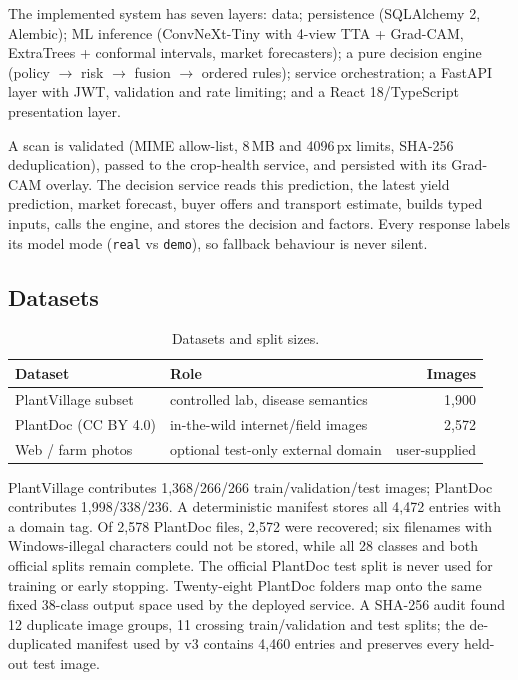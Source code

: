 \documentclass[journal,twocolumn,10pt]{IEEEtran}
\begin{document}
The implemented system has seven layers: data; persistence (SQLAlchemy 2, Alembic); ML inference
(ConvNeXt-Tiny with 4-view TTA + Grad-CAM, ExtraTrees + conformal intervals, market forecasters); a pure decision
engine (policy $\to$ risk $\to$ fusion $\to$ ordered rules); service orchestration; a FastAPI
layer with JWT, validation and rate limiting; and a React 18/TypeScript presentation layer.

A scan is validated (MIME allow-list, 8\,MB and 4096\,px limits, SHA-256 deduplication), passed to
the crop-health service, and persisted with its Grad-CAM overlay. The decision service reads this
prediction, the latest yield prediction, market forecast, buyer offers and transport estimate,
builds typed inputs, calls the engine, and stores the decision and factors. Every response labels
its model mode (\texttt{real} vs \texttt{demo}), so fallback behaviour is never silent.

\subsection{Datasets}

\begin{table}[t]
\centering
\caption{Datasets and split sizes.}
\label{tab:data}
\begin{tabular}{@{}llr@{}}
\toprule
Dataset & Role & Images \\
\midrule
PlantVillage subset & controlled lab, disease semantics & 1{,}900 \\
PlantDoc (CC BY 4.0) & in-the-wild internet/field images & 2{,}572 \\
Web / farm photos & optional test-only external domain & user-supplied \\
\bottomrule
\end{tabular}
\end{table}

PlantVillage contributes 1{,}368/266/266 train/validation/test images; PlantDoc contributes
1{,}998/338/236. A deterministic manifest stores all 4{,}472 entries with a domain tag. Of 2{,}578
PlantDoc files, 2{,}572 were recovered; six filenames with Windows-illegal characters could not be
stored, while all 28 classes and both official splits remain complete. The official PlantDoc test
split is never used for training or early stopping. Twenty-eight PlantDoc folders map onto the
same fixed 38-class output space used by the deployed service. A SHA-256 audit found 12 duplicate
image groups, 11 crossing train/validation and test splits; the de-duplicated manifest used by v3
contains 4{,}460 entries and preserves every held-out test image.
\end{document}
